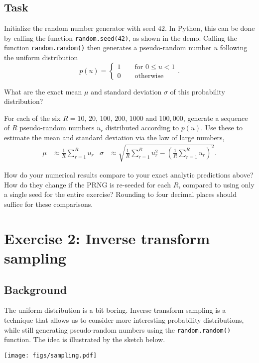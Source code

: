 \documentclass[12 pt]{article} %
\newcommand{\si}{\ensuremath{\sigma} }
\newcommand{\showmarks}[1]{\rightline{\texttt{[#1 marks]}}} %
\begin{document}
\subsection*{Task}
Initialize the random number generator with seed $42$.
In Python, this can be done by calling the function \texttt{random.seed(42)}, as shown in the demo.
Calling the function \texttt{random.random()} then generates a pseudo-random number $u$ following the uniform distribution
\begin{equation*}
  p(u) = \left\{\begin{array}{l}1 \qquad \mbox{for } 0 \leq u < 1 \\
                                0 \qquad \mbox{otherwise}\end{array}\right. .
\end{equation*}

What are the exact mean $\mu$ and standard deviation \si of this probability distribution?

\showmarks{2}

For each of the six $R = 10$, $20$, $100$, $200$, $1000$ and $100{,}000$, generate a sequence of $R$ pseudo-random numbers $u_r$ distributed according to $p(u)$.
Use these to estimate the mean and standard deviation via the law of large numbers,
\begin{align}
  \label{eq:mean}
  \mu & \approx \frac{1}{R} \sum_{r = 1}^R u_r &
  \si & \approx \sqrt{\frac{1}{R} \sum_{r = 1}^R u_r^2 - \left(\frac{1}{R} \sum_{r = 1}^R u_r\right)^2}.
\end{align}

How do your numerical results compare to your exact analytic predictions above?
How do they change if the PRNG is re-seeded for each $R$, compared to using only a single seed for the entire exercise?
Rounding to four decimal places should suffice for these comparisons.

\showmarks{10}



\section*{Exercise 2: Inverse transform sampling}
\subsection*{Background}
The uniform distribution is a bit boring.
Inverse transform sampling is a technique that allows us to consider more interesting probability distributions, while still generating pseudo-random numbers using the \texttt{random.random()} function.
The idea is illustrated by the sketch below.
\begin{center}
  \texttt{[image: figs/sampling.pdf]}
\end{center}
\end{document}

